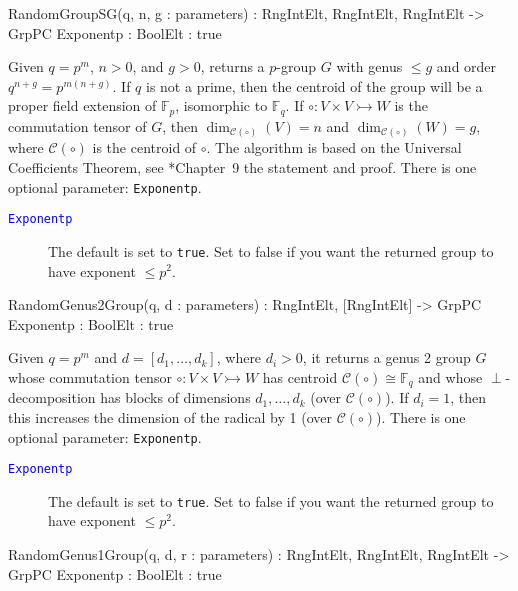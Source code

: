 \documentclass{documentation}
\begin{document}
\begin{intrinsics}
RandomGroupSG(q, n, g : parameters) : RngIntElt, RngIntElt, RngIntElt -> GrpPC
    Exponentp : BoolElt : true
\end{intrinsics}

Given $q=p^m$, $n>0$, and $g>0$, returns a $p$-group $G$ with genus $\leq g$ and order $q^{n+g}=p^{m(n+g)}$. 
If $q$ is not a prime, then the centroid of the group will be a proper field extension of $\mathbb{F}_p$, isomorphic to $\mathbb{F}_q$. 
If $\circ: V\times V\rightarrowtail W$ is the commutation tensor of $G$, then $\dim_{\mathcal{C}(\circ)}(V)=n$ and $\dim_{\mathcal{C}(\circ)}(W)=g$, where $\mathcal{C}(\circ)$ is the centroid of $\circ$. 
The algorithm is based on the Universal Coefficients Theorem, see \cite{LGM:book}*{Chapter~9} the statement and proof.
There is one optional parameter: {\tt Exponentp}. 

\begin{description}
\item[\textcolor{blue}{\tt Exponentp}]
The default is set to {\tt true}.
Set to false if you want the returned group to have exponent $\leq p^2$.  
\end{description}

\begin{intrinsics}
RandomGenus2Group(q, d : parameters) : RngIntElt, [RngIntElt] -> GrpPC
    Exponentp : BoolElt : true
\end{intrinsics}

Given $q=p^m$ and $d=[d_1, \dots, d_k]$, where $d_i>0$, it returns a genus 2 group $G$ whose commutation tensor $\circ : V\times V\rightarrowtail W$ has centroid $\mathcal{C}(\circ)\cong \mathbb{F}_q$ and whose $\perp$-decomposition has blocks of dimensions $d_1,\dots,d_k$ (over $\mathcal{C}(\circ)$).
If $d_i=1$, then this increases the dimension of the radical by 1 (over $\mathcal{C}(\circ)$).
There is one optional parameter: {\tt Exponentp}. 

\begin{description}
\item[\textcolor{blue}{\tt Exponentp}]
The default is set to {\tt true}.
Set to false if you want the returned group to have exponent $\leq p^2$.  
\end{description}

\begin{intrinsics}
RandomGenus1Group(q, d, r : parameters) : RngIntElt, RngIntElt, RngIntElt -> GrpPC
    Exponentp : BoolElt : true
\end{intrinsics}
\end{document}
